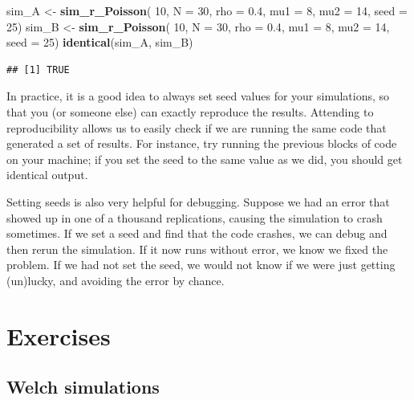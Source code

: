 \documentclass[
]{book}
\newenvironment{Shaded}{\begin{snugshade}}{\end{snugshade}}
\newcommand{\AttributeTok}[1]{\textcolor[rgb]{0.13,0.29,0.53}{#1}}
\newcommand{\DecValTok}[1]{\textcolor[rgb]{0.00,0.00,0.81}{#1}}
\newcommand{\FloatTok}[1]{\textcolor[rgb]{0.00,0.00,0.81}{#1}}
\newcommand{\FunctionTok}[1]{\textcolor[rgb]{0.13,0.29,0.53}{\textbf{#1}}}
\newcommand{\NormalTok}[1]{#1}
\newcommand{\OtherTok}[1]{\textcolor[rgb]{0.56,0.35,0.01}{#1}}
\begin{document}
\begin{Shaded}
\begin{Highlighting}[]
\NormalTok{sim\_A }\OtherTok{\textless{}{-}} \FunctionTok{sim\_r\_Poisson}\NormalTok{( }\DecValTok{10}\NormalTok{, }\AttributeTok{N =} \DecValTok{30}\NormalTok{, }\AttributeTok{rho =} \FloatTok{0.4}\NormalTok{, }\AttributeTok{mu1 =} \DecValTok{8}\NormalTok{, }\AttributeTok{mu2 =} \DecValTok{14}\NormalTok{,}
                        \AttributeTok{seed =} \DecValTok{25}\NormalTok{)}
\NormalTok{sim\_B }\OtherTok{\textless{}{-}} \FunctionTok{sim\_r\_Poisson}\NormalTok{( }\DecValTok{10}\NormalTok{, }\AttributeTok{N =} \DecValTok{30}\NormalTok{, }\AttributeTok{rho =} \FloatTok{0.4}\NormalTok{, }\AttributeTok{mu1 =} \DecValTok{8}\NormalTok{, }\AttributeTok{mu2 =} \DecValTok{14}\NormalTok{,}
                        \AttributeTok{seed =} \DecValTok{25}\NormalTok{)}
\FunctionTok{identical}\NormalTok{(sim\_A, sim\_B)}
\end{Highlighting}
\end{Shaded}

\begin{verbatim}
## [1] TRUE
\end{verbatim}

In practice, it is a good idea to always set seed values for your simulations, so that you (or someone else) can exactly reproduce the results.
Attending to reproducibility allows us to easily check if we are running the same code that generated a set of results.
For instance, try running the previous blocks of code on your machine; if you set the seed to the same value as we did, you should get identical output.

Setting seeds is also very helpful for debugging.
Suppose we had an error that showed up in one of a thousand replications, causing the simulation to crash sometimes.
If we set a seed and find that the code crashes, we can debug and then rerun the simulation.
If it now runs without error, we know we fixed the problem.
If we had not set the seed, we would not know if we were just getting (un)lucky, and avoiding the error by chance.

\section{Exercises}\label{exercises-5}

\subsection{Welch simulations}\label{Welch-simulation}
\end{document}
